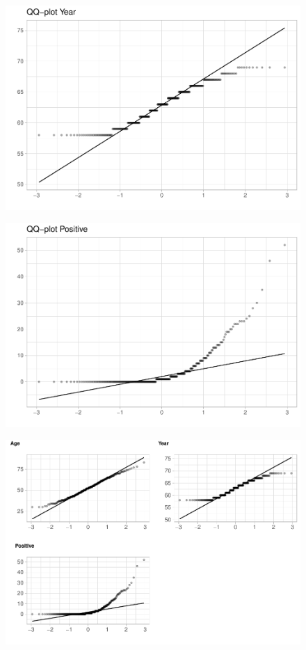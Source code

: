 \begin{figure}[H]\includegraphics[width=.9\linewidth]{img/EDA2_files/figure-latex/unnamed-chunk-18-2} \end{figure}

\begin{figure}[H]\includegraphics[width=.9\linewidth]{img/EDA2_files/figure-latex/unnamed-chunk-18-3} \end{figure}

\begin{figure}[H]\includegraphics[width=.9\linewidth]{img/EDA2_files/figure-latex/unnamed-chunk-18-4} \end{figure}

